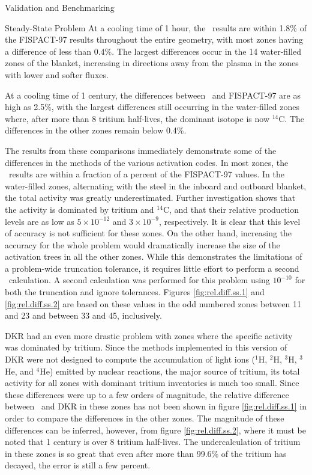 \begin{chapter}{Validation and Benchmarking}
\begin{section}{Steady-State Problem}
    At a cooling time of 1 hour, the \ALARA\ results are within 1.8\%
    of the FISPACT-97 results throughout the entire geometry, with
    most zones having a difference of less than 0.4\%.  The largest
    differences occur in the 14 water-filled zones of the blanket,
    increasing in directions away from the plasma in the zones with
    lower and softer fluxes.
    
    At a cooling time of 1 century, the differences between \ALARA\ 
    and FISPACT-97 are as high as 2.5\%, with the largest differences
    still occurring in the water-filled zones where, after more than 8
    tritium half-lives, the dominant isotope is now $^{14}$C.  The
    differences in the other zones remain below 0.4\%.
    
    The results from these comparisons immediately demonstrate some of
    the differences in the methods of the various activation codes.
    In most zones, the \ALARA\ results are within a fraction of a
    percent of the FISPACT-97 values.  In the water-filled zones,
    alternating with the steel in the inboard and outboard blanket,
    the total activity was greatly underestimated.  Further
    investigation shows that the activity is dominated by tritium and
    $^{14}$C, and that their relative production levels are as low as
    $5 \times 10^{-12}$ and $3 \times 10^{-9}$, respectively.  It is
    clear that this level of accuracy is not sufficient for these
    zones.  On the other hand, increasing the accuracy for the whole
    problem would dramatically increase the size of the activation
    trees in all the other zones.  While this demonstrates the
    limitations of a problem-wide truncation tolerance, it requires
    little effort to perform a second \ALARA\ calculation.  A second
    calculation was performed for this problem using $10^{-10}$ for
    both the truncation and ignore tolerances.  Figures
    \ref{fig:rel.diff.ss.1} and \ref{fig:rel.diff.ss.2} are based on
    these values in the odd numbered zones between 11 and 23 and
    between 33 and 45, inclusively.
    
    DKR had an even more drastic problem with zones where the specific
    activity was dominated by tritium.  Since the methods implemented
    in this version of DKR were not designed to compute the
    accumulation of light ions ($^1$H, $^2$H, $^3$H, $^3$He, and
    $^4$He) emitted by nuclear reactions, the major source of tritium,
    its total activity for all zones with dominant tritium inventories
    is much too small.  Since these differences were up to a few
    orders of magnitude, the relative difference between \ALARA\ and
    DKR in these zones has not been shown in figure
    \ref{fig:rel.diff.ss.1} in order to compare the differences in the
    other zones.  The magnitude of these differences can be inferred,
    however, from figure \ref{fig:rel.diff.ss.2}, where it must be
    noted that 1 century is over 8 tritium half-lives.  The
    undercalculation of tritium in these zones is so great that even
    after more than 99.6\% of the tritium has decayed, the error is
    still a few percent.
    

\end{section}
\end{chapter}

